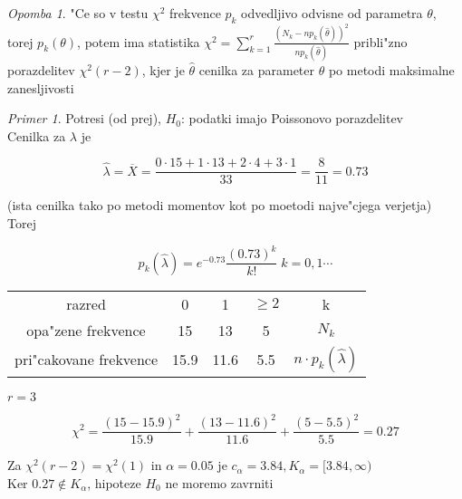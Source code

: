 \documentclass[a4paper,12pt]{article}
\theoremstyle{definition}
\theoremstyle{remark}
\newtheorem*{ex}{Primer}
\newtheorem*{rem}{Opomba}
\begin{document}
\begin{rem}
    "Ce so v testu $\chi^2$ frekvence $p_k$ odvedljivo odvisne od parametra $\theta$, torej $p_k(\theta)$, potem ima
    statistika $\chi^2 = \sum_{k=1}^{r} \frac{(N_k - n p_k(\hat{\theta}))^2}{n p_k(\hat{\theta})}$ pribli"zno
    porazdelitev $\chi^2(r-2)$, kjer je $\hat{\theta}$ cenilka za parameter $\theta$ po metodi maksimalne zanesljivosti
\end{rem}

\begin{ex}
    Potresi (od prej), $H_0$: podatki imajo Poissonovo porazdelitev \\
    Cenilka za $\lambda$ je 
    
    \begin{equation*}
        \hat{\lambda} = \overline{X} = \frac{0 \cdot 15 + 1 \cdot 13 + 2 \cdot 4 + 3 \cdot 1}{33} = \frac{8}{11} = 0.73
    \end{equation*}

    (ista cenilka tako po metodi momentov kot po moetodi najve"cjega verjetja) \\
    Torej

    \begin{equation*}
        p_k(\hat{\lambda}) = e^{-0.73} \frac{(0.73)^k}{k!} \; k = 0, 1 \cdots
    \end{equation*}

    \begin{center}
        \begin{tabular}{c c c c c}
            razred & 0 & 1 & $\geq 2$ & k \\
            opa"zene frekvence & 15 & 13 & 5 & $N_k$ \\
            pri"cakovane frekvence & 15.9 & 11.6 & 5.5 & $n \cdot p_k(\hat{\lambda})$
        \end{tabular}
    \end{center}

    $r=3$

    \begin{equation*}
        \chi^2 = \frac{(15-15.9)^2}{15.9} + \frac{(13-11.6)^2}{11.6} + \frac{(5-5.5)^2}{5.5} = 0.27
    \end{equation*}

    Za $\chi^2(r-2) = \chi^2(1)$ in $\alpha = 0.05$ je $c_{\alpha} = 3.84, K_{\alpha} = [3.84, \infty)$ \\
    Ker $0.27 \notin K_{\alpha}$, hipoteze $H_0$ ne moremo zavrniti
\end{ex}
\end{document}
